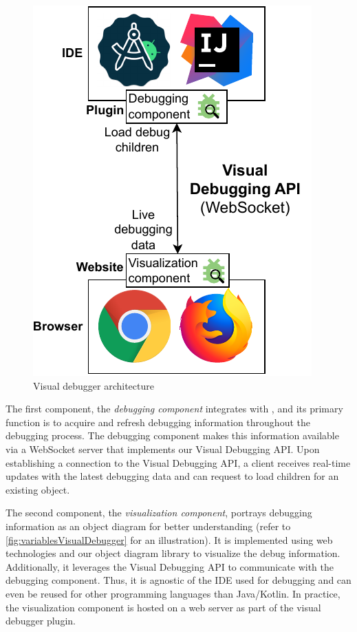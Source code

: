 \documentclass[sigconf]{acmart}
\begin{document}
\begin{figure}[ht]
  \centering
  \includegraphics[width=0.7\linewidth]{images/visual-debugger-architecture.pdf}
  \caption{Visual debugger architecture}
  \label{fig:architecture}
\end{figure}

The first component, the \textit{debugging component} integrates with \intellij{}, and its primary function is to acquire and refresh debugging information throughout the debugging process.
The debugging component makes this information available via a WebSocket server that implements our Visual Debugging API.
Upon establishing a connection to the Visual Debugging API, a client receives real-time updates with the latest debugging data and can request to load children for an existing object.

The second component, the \textit{visualization component}, portrays debugging information as an object diagram for better understanding (refer to \autoref{fig:variablesVisualDebugger} for an illustration).
It is implemented using web technologies and our object diagram library \cite{timkrauterObjectdiagramjs2023} to visualize the debug information.
Additionally, it leverages the Visual Debugging API to communicate with the debugging component.
Thus, it is agnostic of the IDE used for debugging and can even be reused for other programming languages than Java/Kotlin.
In practice, the visualization component is hosted on a web server as part of the visual debugger plugin.
\end{document}
